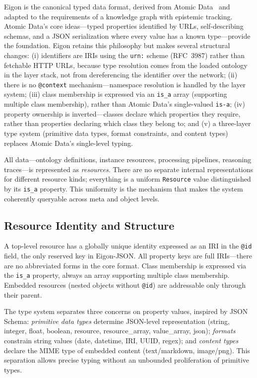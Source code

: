 \documentclass[10pt,twocolumn,letterpaper]{article}
\newcommand{\code}[1]{\texttt{\small #1}}
\begin{document}
Eigon is the canonical typed data format, derived from Atomic Data~\cite{atomicdata} and adapted to the requirements of a knowledge graph with epistemic tracking.
Atomic Data's core ideas---typed properties identified by URLs, self-describing schemas, and a JSON serialization where every value has a known type---provide the foundation.
Eigon retains this philosophy but makes several structural changes:
(i) identifiers are IRIs using the \code{urn:} scheme (RFC~3987) rather than fetchable HTTP URLs, because type resolution comes from the loaded ontology in the layer stack, not from dereferencing the identifier over the network;
(ii) there is no \code{@context} mechanism---namespace resolution is handled by the layer system;
(iii) class membership is expressed via an \code{is\_a} array (supporting multiple class membership), rather than Atomic Data's single-valued \code{is-a};
(iv) property ownership is inverted---classes declare which properties they require, rather than properties declaring which class they belong to;
and (v) a three-layer type system (primitive data types, format constraints, and content types) replaces Atomic Data's single-level typing.

All data---ontology definitions, instance resources, processing pipelines, reasoning traces---is represented as \emph{resources}.
There are no separate internal representations for different resource kinds; everything is a uniform \code{Resource} value distinguished by its \code{is\_a} property.
This uniformity is the mechanism that makes the system coherently queryable across meta and object levels.

\subsection{Resource Identity and Structure}

A top-level resource has a globally unique identity expressed as an IRI in the \code{@id} field, the only reserved key in Eigon-JSON.
All property keys are full IRIs---there are no abbreviated forms in the core format.
Class membership is expressed via the \code{is\_a} property, always an array supporting multiple class membership.
Embedded resources (nested objects without \code{@id}) are addressable only through their parent.

The type system separates three concerns on property values, inspired by JSON Schema:
\emph{primitive data types} determine JSON-level representation (string, integer, float, boolean, resource, resource\_array, value\_array, json);
\emph{formats} constrain string values (date, datetime, IRI, UUID, regex);
and \emph{content types} declare the MIME type of embedded content (text/markdown, image/png).
This separation allows precise typing without an unbounded proliferation of primitive types.
\end{document}
